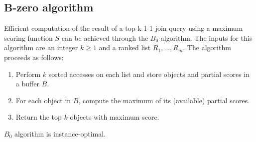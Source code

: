 \subsection{B-zero algorithm}
Efficient computation of the result of a top-k 1-1 join query using a maximum scoring function $S$ can be achieved through the $B_0$ algorithm. 
The inputs for this algorithm are an integer $k \geq 1$ and a ranked list $R_1,\dots,R_m$.
The algorithm proceeds as follows:
\begin{enumerate}
    \item Perform $k$ sorted accesses on each list and store objects and partial scores in a buffer $B$. 
    \item For each object in $B$, compute the maximum of its (available) partial scores.
    \item Return the top $k$ objects with maximum score.
\end{enumerate}
\begin{property}
    $B_0$ algorithm is instance-optimal. 
\end{property}
